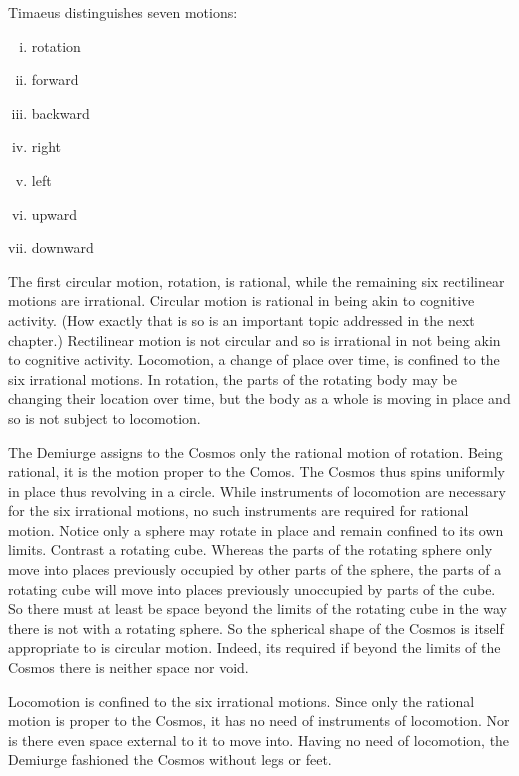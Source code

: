 Timaeus distinguishes seven motions:
\begin{enumerate}[(i)]
	\item rotation
	\item forward
	\item backward
	\item right
	\item left
	\item upward
	\item downward
\end{enumerate}
The first circular motion, rotation, is rational, while the remaining six rectilinear motions are irrational. Circular motion is rational in being akin to cognitive activity. (How exactly that is so is an important topic addressed in the next chapter.) Rectilinear motion is not circular and so is irrational in not being akin to cognitive activity. Locomotion, a change of place over time, is confined to the six irrational motions. In rotation, the parts of the rotating body may be changing their location over time, but the body as a whole is moving in place and so is not subject to locomotion. 

The Demiurge assigns to the Cosmos only the rational motion of rotation. Being rational, it is the motion proper to the Comos. The Cosmos thus spins uniformly in place thus revolving in a circle. While instruments of locomotion are necessary for the six irrational motions, no such instruments are required for rational motion. Notice only a sphere may rotate in place and remain confined to its own limits. Contrast a rotating cube. Whereas the parts of the rotating sphere only move into places previously occupied by other parts of the sphere, the parts of a rotating cube will move into places previously unoccupied by parts of the cube. So there must at least be space beyond the limits of the rotating cube in the way there is not with a rotating sphere. So the spherical shape of the Cosmos is itself appropriate to is circular motion. Indeed, its required if beyond the limits of the Cosmos there is neither space nor void.



Locomotion is confined to the six irrational motions. Since only the rational motion is proper to the Cosmos, it has no need of instruments of locomotion. Nor is there even space external to it to move into. Having no need of locomotion, the Demiurge fashioned the Cosmos without legs or feet.

